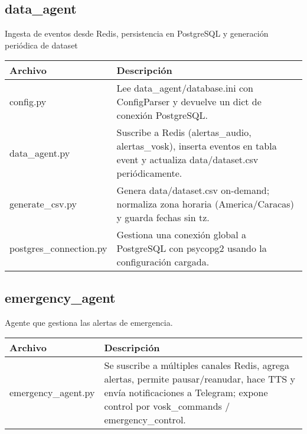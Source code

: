 \subsection*{data\_agent}

Ingesta de eventos desde Redis, persistencia en PostgreSQL y generación periódica de dataset

\begin{table}[H]
  \doublespacing
  \begin{tabularx}{\textwidth}{l X}
    \hline
    \textbf{Archivo}        & \textbf{Descripción}                                                                                                          \\
    \hline
    config.py               & Lee data\_agent/database.ini con ConfigParser y devuelve un dict de conexión PostgreSQL.                                      \\
    data\_agent.py          & Suscribe a Redis (alertas\_audio, alertas\_vosk), inserta eventos en tabla event y actualiza data/dataset.csv periódicamente. \\
    generate\_csv.py        & Genera data/dataset.csv on-demand; normaliza zona horaria (America/Caracas) y guarda fechas sin tz.                           \\
    postgres\_connection.py & Gestiona una conexión global a PostgreSQL con psycopg2 usando la configuración cargada.                                       \\
    \hline
  \end{tabularx}
\end{table}

\subsection*{emergency\_agent}

Agente que gestiona las alertas de emergencia.

\begin{table}[H]
  \doublespacing
  \begin{tabularx}{\textwidth}{l X}
    \hline
    \textbf{Archivo}    & \textbf{Descripción} \\
    \hline
    emergency\_agent.py &
    Se suscribe a múltiples canales Redis, agrega alertas, permite pausar/reanudar, hace TTS y envía notificaciones a Telegram; expone control por vosk\_commands / emergency\_control.
    \\
    \hline
  \end{tabularx}
\end{table}

